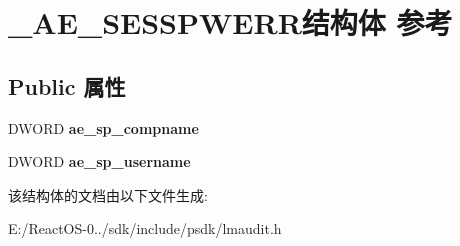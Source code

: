 \hypertarget{struct___a_e___s_e_s_s_p_w_e_r_r}{}\section{\+\_\+\+A\+E\+\_\+\+S\+E\+S\+S\+P\+W\+E\+R\+R结构体 参考}
\label{struct___a_e___s_e_s_s_p_w_e_r_r}
\subsection*{Public 属性}
\begin{DoxyCompactItemize}
\item 
\mbox{\label{struct___a_e___s_e_s_s_p_w_e_r_r_abf221f68c778d78ec0325ec28a453393}} 
D\+W\+O\+RD {\bfseries ae\+\_\+sp\+\_\+compname}
\item 
\mbox{\label{struct___a_e___s_e_s_s_p_w_e_r_r_abf7c1dad590b54fd9477e0e874da2451}} 
D\+W\+O\+RD {\bfseries ae\+\_\+sp\+\_\+username}
\end{DoxyCompactItemize}


该结构体的文档由以下文件生成\+:\begin{DoxyCompactItemize}
\item 
E\+:/\+React\+O\+S-\/0../sdk/include/psdk/lmaudit.\+h\end{DoxyCompactItemize}
